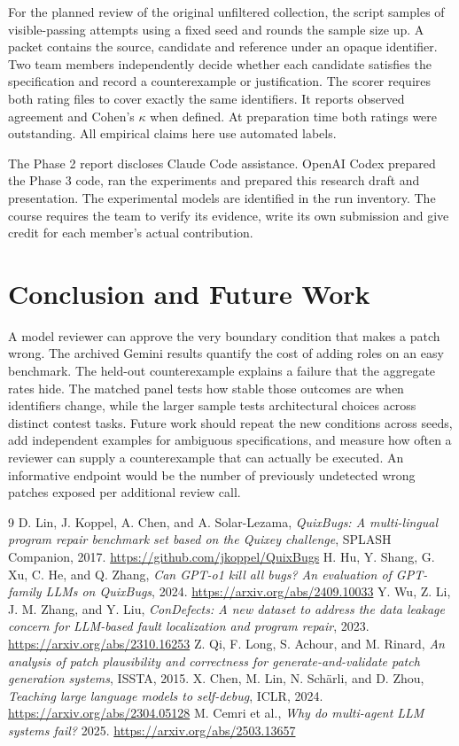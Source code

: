 \documentclass[conference]{IEEEtran}
\begin{document}
For the planned review of the original unfiltered collection, the script samples \ReviewSample{} of \ReviewEligible{} visible-passing attempts using a fixed seed and rounds the sample size up. A packet contains the source, candidate and reference under an opaque identifier. Two team members independently decide whether each candidate satisfies the specification and record a counterexample or justification. The scorer requires both rating files to cover exactly the same identifiers. It reports observed agreement and Cohen's $\kappa$ when defined. At preparation time both ratings were outstanding. All empirical claims here use automated labels.

The Phase 2 report discloses Claude Code assistance. OpenAI Codex prepared the Phase 3 code, ran the experiments and prepared this research draft and presentation. The experimental models are identified in the run inventory. The course requires the team to verify its evidence, write its own submission and give credit for each member's actual contribution.

\section{Conclusion and Future Work}
A model reviewer can approve the very boundary condition that makes a patch wrong. The archived Gemini results quantify the cost of adding roles on an easy benchmark. The held-out counterexample explains a failure that the aggregate rates hide. The matched panel tests how stable those outcomes are when identifiers change, while the larger sample tests architectural choices across distinct contest tasks. Future work should repeat the new conditions across seeds, add independent examples for ambiguous specifications, and measure how often a reviewer can supply a counterexample that can actually be executed. An informative endpoint would be the number of previously undetected wrong patches exposed per additional review call.


\begin{thebibliography}{9}
 D. Lin, J. Koppel, A. Chen, and A. Solar-Lezama, \emph{QuixBugs: A multi-lingual program repair benchmark set based on the Quixey challenge}, SPLASH Companion, 2017. \url{https://github.com/jkoppel/QuixBugs}
 H. Hu, Y. Shang, G. Xu, C. He, and Q. Zhang, \emph{Can GPT-o1 kill all bugs? An evaluation of GPT-family LLMs on QuixBugs}, 2024. \url{https://arxiv.org/abs/2409.10033}
 Y. Wu, Z. Li, J. M. Zhang, and Y. Liu, \emph{ConDefects: A new dataset to address the data leakage concern for LLM-based fault localization and program repair}, 2023. \url{https://arxiv.org/abs/2310.16253}
 Z. Qi, F. Long, S. Achour, and M. Rinard, \emph{An analysis of patch plausibility and correctness for generate-and-validate patch generation systems}, ISSTA, 2015.
 X. Chen, M. Lin, N. Sch\"arli, and D. Zhou, \emph{Teaching large language models to self-debug}, ICLR, 2024. \url{https://arxiv.org/abs/2304.05128}
 M. Cemri et al., \emph{Why do multi-agent LLM systems fail?} 2025. \url{https://arxiv.org/abs/2503.13657}
\end{thebibliography}
\end{document}
